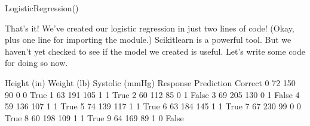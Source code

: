\documentclass[letterpaper,10pt,english]{jupyterBook}
\begin{document}
\begin{sphinxVerbatim}[commandchars=\\\{\}]
LogisticRegression()
\end{sphinxVerbatim}

\sphinxAtStartPar
That’s it!  We’ve created our logistic regression in just two lines of code!  (Okay, plus one line for importing the module.)  Scikit\sphinxhyphen{}learn is a powerful tool.  But we haven’t yet checked to see if the model we created is useful.  Let’s write some code for doing so now.

\begin{sphinxVerbatim}[commandchars=\\\{\}]
\PYG{p}{[}\PYG{p}{]}    
\PYG{p}{[}\PYG{p}{]}  \PYG{p}{[}\PYG{p}{]}  \PYG{p}{[}\PYG{p}{]}
\end{sphinxVerbatim}

\begin{sphinxVerbatim}[commandchars=\\\{\}]
   Height (in)  Weight (lb)  Systolic (mmHg)  Response  Prediction  Correct
0           72          150               90         0           0     True
1           63          191              105         1           1     True
2           60          112               85         0           1    False
3           69          205              130         0           1    False
4           59          136              107         1           1     True
5           74          139              117         1           1     True
6           63          184              145         1           1     True
7           67          230               99         0           0     True
8           60          198              109         1           1     True
9           64          169               89         1           0    False
\end{sphinxVerbatim}
\end{document}

